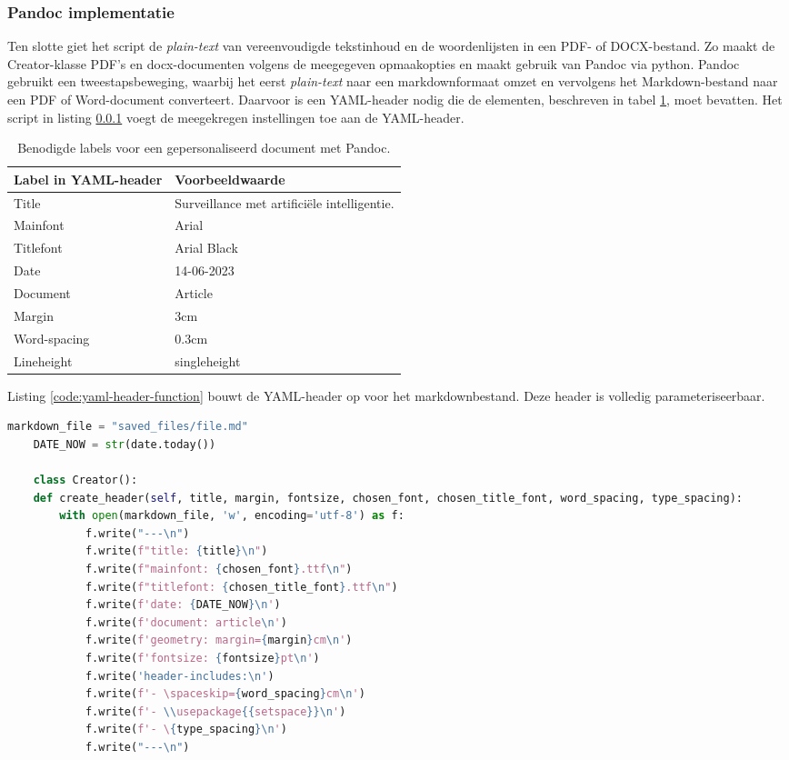 \subsubsection{Pandoc implementatie}

Ten slotte giet het script de \textit{plain-text} van vereenvoudigde tekstinhoud en de woordenlijsten in een PDF- of DOCX-bestand. Zo maakt de Creator-klasse PDF's en docx-documenten volgens de meegegeven opmaakopties en maakt gebruik van Pandoc via python.  Pandoc gebruikt een tweestapsbeweging, waarbij het eerst \textit{plain-text} naar een markdownformaat omzet en vervolgens het Markdown-bestand naar een PDF of Word-document converteert. Daarvoor is een YAML-header nodig die de elementen, beschreven in tabel \ref{table:personalized-pdf-word-document-with-pandoc}, moet bevatten. Het script in listing \ref{} voegt de meegekregen instellingen toe aan de YAML-header. 

\begin{table}[H]
	\begin{tabular}{ | m{5cm}| m{10cm} | }
		\hline
		\textbf{Label in YAML-header} & \textbf{Voorbeeldwaarde} \\ \hline
		Title & Surveillance met artificiële intelligentie. \\ \hline
		Mainfont & Arial \\ \hline 
		Titlefont & Arial Black \\ \hline
		Date & 14-06-2023 \\ \hline 
		Document & Article \\ \hline
		Margin & 3cm \\ \hline
		Word-spacing & 0.3cm \\ \hline 
		Lineheight & singleheight \\ \hline
	\end{tabular}
	\caption{Benodigde labels voor een gepersonaliseerd document met Pandoc.}
	\label{table:personalized-pdf-word-document-with-pandoc}
\end{table}

Listing \ref{code:yaml-header-function} bouwt de YAML-header op voor het markdownbestand. Deze header is volledig parameteriseerbaar.

\begin{lstlisting}[language=Python, caption={Writer-klasse omvattende de code om dynamische PDF- en Word-documenten te genereren.}, label={code:yaml-header-function}]
	markdown_file = "saved_files/file.md"
	DATE_NOW = str(date.today())
	
	class Creator():
	def create_header(self, title, margin, fontsize, chosen_font, chosen_title_font, word_spacing, type_spacing):
		with open(markdown_file, 'w', encoding='utf-8') as f:
			f.write("---\n")
			f.write(f"title: {title}\n") 
			f.write(f"mainfont: {chosen_font}.ttf\n")
			f.write(f"titlefont: {chosen_title_font}.ttf\n")
			f.write(f'date: {DATE_NOW}\n')
			f.write(f'document: article\n')
			f.write(f'geometry: margin={margin}cm\n')
			f.write(f'fontsize: {fontsize}pt\n')
			f.write('header-includes:\n')
			f.write(f'- \spaceskip={word_spacing}cm\n')
			f.write(f'- \\usepackage{{setspace}}\n')
			f.write(f'- \{type_spacing}\n')
			f.write("---\n")
\end{lstlisting}

